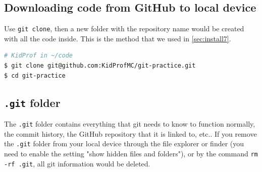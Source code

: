 \subsection{Downloading code from GitHub to local device}

Use \texttt{git clone}, then a new folder with the repository name would be created with all the code inside. This is the method that we used in \cref{sec:install7}.

\begin{lstlisting}[language=bash]
# KidProf in ~/code
$ git clone git@github.com:KidProfMC/git-practice.git
$ cd git-practice
\end{lstlisting}

\subsection{\texttt{.git} folder}

The \texttt{.git} folder contains everything that git needs to know to function normally, the commit history, the GitHub repository that it is linked to, etc.. If you remove the \texttt{.git} folder from your local device through the file explorer or finder (you need to enable the setting "show hidden files and folders"), or by the command \texttt{rm -rf .git}, all git information would be deleted.

